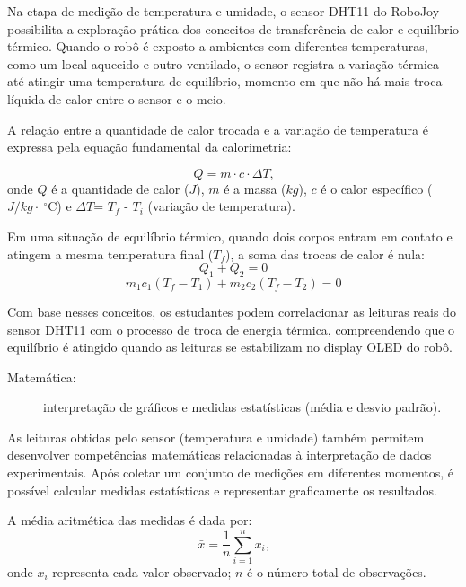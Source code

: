 \documentclass[portuguese]{textolivre}
\begin{document}
Na etapa de medição de temperatura e umidade, o sensor DHT11 do RoboJoy possibilita a exploração prática dos conceitos de transferência de calor e equilíbrio térmico. Quando o robô é exposto a ambientes com diferentes temperaturas, como um local aquecido e outro ventilado, o sensor registra a variação térmica até atingir uma temperatura de equilíbrio, momento em que não há mais troca líquida de calor entre o sensor e o meio.

A relação entre a quantidade de calor trocada e a variação de temperatura é expressa pela equação fundamental da calorimetria:

\begin{equation}
	Q = m \cdot c \cdot \Delta T \text{,}
\end{equation}
onde $Q$ é a quantidade de calor ($J$), $m$ é a massa ($kg$), 
$c$ é o calor específico ($J/kg·~^{\circ}\mathrm{C}$) e
$\Delta T $= $T_f$ - $T_i$ (variação de temperatura).

Em uma situação de equilíbrio térmico, quando dois corpos entram em contato e atingem a mesma temperatura final ($T_f$), a soma das trocas de calor é nula:
\begin{equation}
	Q_1 + Q_2 = 0
\end{equation}
\begin{equation}
	m_1 c_1 (T_f - T_1) + m_2 c_2 (T_f - T_2) = 0
\end{equation}

Com base nesses conceitos, os estudantes podem correlacionar as leituras reais do sensor DHT11 com o processo de troca de energia térmica, compreendendo que o equilíbrio é atingido quando as leituras se estabilizam no display OLED do robô.

\begin{description}
    \item[Matemática:] interpretação de gráficos e medidas estatísticas (média e desvio padrão).
\end{description}

As leituras obtidas pelo sensor (temperatura e umidade) também permitem desenvolver competências matemáticas relacionadas à interpretação de dados experimentais. Após coletar um conjunto de medições em diferentes momentos, é possível calcular medidas estatísticas e representar graficamente os resultados.

A média aritmética das medidas é dada por:
\begin{equation}
	\bar{x} = \frac{1}{n} \sum_{i=1}^{n} x_i \text{,}
\end{equation}
onde $x_i$ representa cada valor observado; $n$ é o número total de observações.
\end{document}
